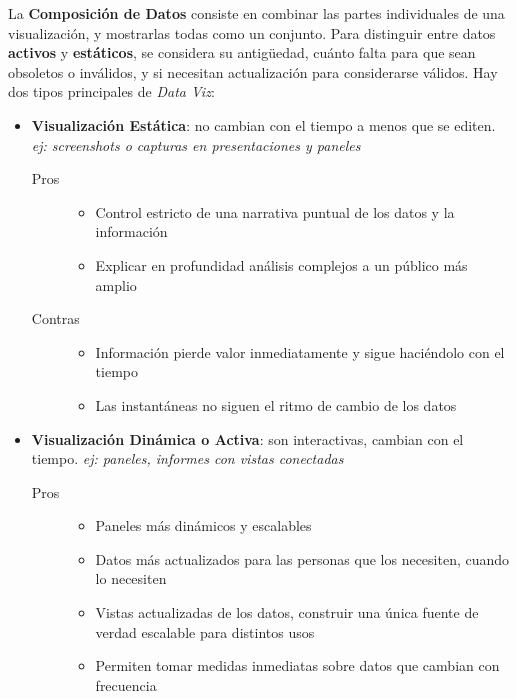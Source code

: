 La \textbf{Composición de Datos} consiste en combinar las partes individuales de una visualización, y mostrarlas todas como un conjunto. Para distinguir entre datos \textbf{activos} y \textbf{estáticos}, se considera su antigüedad, cuánto falta para que sean obsoletos o inválidos, y si necesitan actualización para considerarse válidos. Hay dos tipos principales de \textit{Data Viz}:
\begin{itemize}
    \item {\textbf{Visualización Estática}: no cambian con el tiempo a menos que se editen. \textit{ej: screenshots o capturas en presentaciones y paneles}
    \begin{description}
        \item [Pros]{ 
        \begin{itemize}
            \item {Control estricto de una narrativa puntual de los datos y la información}
            \item {Explicar en profundidad análisis complejos a un público más amplio}
        \end{itemize}}
        \item [Contras]{ 
        \begin{itemize}
            \item {Información pierde valor inmediatamente y sigue haciéndolo con el tiempo}
            \item {Las instantáneas no siguen el ritmo de cambio de los datos}
        \end{itemize}}
    \end{description}}
    \item {\textbf{Visualización Dinámica o Activa}: son interactivas, cambian con el tiempo. \textit{ej: paneles, informes con vistas conectadas}
    \begin{description}
        \item[Pros]{
        \begin{itemize}
            \item {Paneles más dinámicos y escalables}
            \item {Datos más actualizados para las personas que los necesiten, cuando lo necesiten}
            \item {Vistas actualizadas de los datos, construir una única fuente de verdad escalable para distintos usos}
            \item {Permiten tomar medidas inmediatas sobre datos que cambian con frecuencia}

\end{itemize}}
\end{description}}
\end{itemize}
